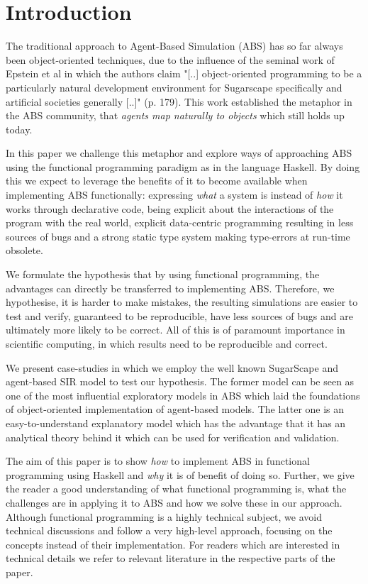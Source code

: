 \section{Introduction}
The traditional approach to Agent-Based Simulation (ABS) has so far always been object-oriented techniques, due to the influence of the seminal work of Epstein et al \cite{epstein_growing_1996} in which the authors claim "[..] object-oriented programming to be a particularly natural development environment for Sugarscape specifically and artificial societies generally [..]" (p. 179). This work established the metaphor in the ABS community, that \textit{agents map naturally to objects} \citep{north_managing_2007} which still holds up today.

In this paper we challenge this metaphor and explore ways of approaching ABS using the functional programming paradigm as in the language Haskell. By doing this we expect to leverage the benefits of it \citep{hudak_history_2007} to become available when implementing ABS functionally: expressing \textit{what} a system is instead of \textit{how} it works through declarative code, being explicit about the interactions of the program with the real world, explicit data-centric programming resulting in less sources of bugs and a strong static type system making type-errors at run-time obsolete. 

We formulate the hypothesis that by using functional programming, the advantages can directly be transferred to implementing ABS. Therefore, we hypothesise, it is harder to make mistakes, the resulting simulations are easier to test and verify, guaranteed to be reproducible, have less sources of bugs and are ultimately more likely to be correct. All of this is of paramount importance in scientific computing, in which results need to be reproducible and correct.

We present case-studies in which we employ the well known SugarScape \citep{epstein_growing_1996} and agent-based SIR \citep{macal_agent-based_2010} model to test our hypothesis. The former model can be seen as one of the most influential exploratory models in ABS which laid the foundations of object-oriented implementation of agent-based models. The latter one is an easy-to-understand explanatory model which has the advantage that it has an analytical theory behind it which can be used for verification and validation.

The aim of this paper is to show \textit{how} to implement ABS in functional programming using Haskell and \textit{why} it is of benefit of doing so. Further, we give the reader a good understanding of what functional programming is, what the challenges are in applying it to ABS and how we solve these in our approach. Although functional programming is a highly technical subject, we avoid technical discussions and follow a very high-level approach, focusing on the concepts instead of their implementation. For readers which are interested in technical details we refer to relevant literature in the respective parts of the paper.

